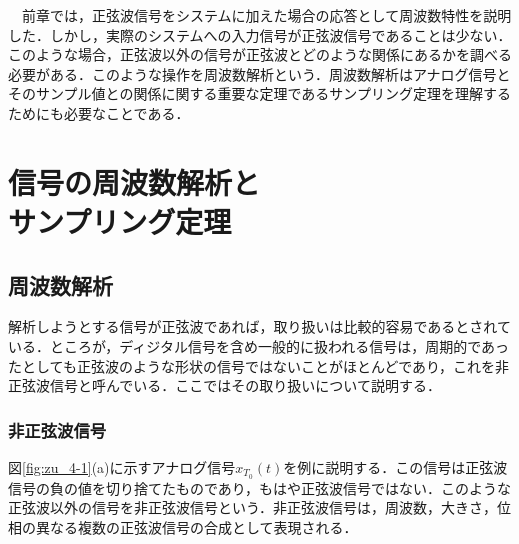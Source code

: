 
\begin{lead}
　前章では，正弦波信号をシステムに加えた場合の応答として周波数特性を説明した．しかし，実際のシステムへの入力信号が正弦波信号であることは少ない．このような場合，正弦波以外の信号が正弦波とどのような関係にあるかを調べる必要がある．このような操作を周波数解析という．周波数解析はアナログ信号とそのサンプル値との関係に関する重要な定理であるサンプリング定理を理解するためにも必要なことである．


\end{lead}





\chapter[信号の周波数解析とサンプリング定理]{信号の周波数解析と\\サンプリング定理}
\label{chapter:6}

\section{周波数解析}

解析しようとする信号が正弦波であれば，取り扱いは比較的容易であるとされている．ところが，ディジタル信号を含め一般的に扱われる信号は，周期的であったとしても正弦波のような形状の信号ではないことがほとんどであり，これを非正弦波信号と呼んでいる．ここではその取り扱いについて説明する．

\subsection{非正弦波信号}

図\ref{fig:zu_4-1}(a)に示すアナログ信号$x_{T_0}(t)$を例に説明する．この信号は正弦波信号の負の値を切り捨てたものであり，もはや正弦波信号ではない．このような正弦波以外の信号を非正弦波信号という．非正弦波信号は，周波数，大きさ，位相の異なる複数の正弦波信号の合成として表現される．

